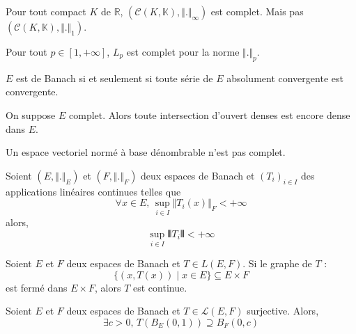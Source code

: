 
  \begin{example}
    Pour tout compact $K$ de $\mathbb{R}$, $(\mathcal{C}(K, \mathbb{K}), \Vert . \Vert_\infty)$ est complet. Mais pas $(\mathcal{C}(K, \mathbb{K}), \Vert . \Vert_1)$.
  \end{example}

  \begin{theorem}
    Pour tout $p \in [1, +\infty]$, $L_p$ est complet pour la norme $\Vert . \Vert_p$.
  \end{theorem}


  \begin{proposition}
    $E$ est de Banach si et seulement si toute série de $E$ absolument convergente est convergente.
  \end{proposition}


  \begin{theorem}[Baire]
    On suppose $E$ complet. Alors toute intersection d'ouvert denses est encore dense dans $E$.
  \end{theorem}


  \begin{application}
    Un espace vectoriel normé à base dénombrable n'est pas complet.
  \end{application}


  \begin{application}
    Soient $(E, \Vert . \Vert_E)$ et $(F, \Vert . \Vert_F)$ deux espaces de Banach et $(T_i)_{i \in I}$ des applications linéaires continues telles que
    \[ \forall x \in E, \, \sup_{i \in I} \Vert T_i(x) \Vert_F < +\infty \]
    alors,
    \[ \sup_{i \in I} \VERT T_i \VERT < +\infty \]
  \end{application}

  \begin{application}
    Soient $E$ et $F$ deux espaces de Banach et $T \in L(E,F)$. Si le graphe de $T$ :
    \[ \{ (x, T(x)) \mid x \in E \} \subseteq E \times F \]
    est fermé dans $E \times F$, alors $T$ est continue.
  \end{application}

    \begin{application}
    Soient $E$ et $F$ deux espaces de Banach et $T \in \mathcal{L}(E,F)$ surjective. Alors,
    \[ \exists c > 0, \, T\left(B_E(0,1)\right) \supseteq B_F(0,c) \]
  \end{application}

